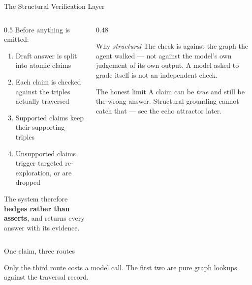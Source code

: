 \documentclass[aspectratio=169,12pt]{beamer}
\begin{document}
\begin{frame}{The Structural Verification Layer}
  \begin{columns}[T]
    \begin{column}{0.5\textwidth}
      \small
      Before anything is emitted:
      \begin{enumerate}
        \item Draft answer is split into \alert{atomic claims}
        \item Each claim is checked against the \alert{triples actually
          traversed}
        \item Supported claims keep their supporting triples
        \item Unsupported claims trigger \alert{targeted re-exploration}, or
          are \alert{dropped}
      \end{enumerate}
      \vspace{2mm}
      The system therefore \textbf{hedges rather than asserts}, and returns
      every answer with its evidence.
    \end{column}
    \begin{column}{0.48\textwidth}
      \begin{block}{Why \emph{structural}}
        \small
        The check is against the graph the agent walked --- not against the
        model's own judgement of its own output. A model asked to grade itself
        is not an independent check.
      \end{block}
      \vspace{2mm}
      \begin{block}{The honest limit}
        \small
        A claim can be \emph{true} and still be the wrong answer. Structural
        grounding cannot catch that --- see the echo attractor later.
      \end{block}
    \end{column}
  \end{columns}
\end{frame}

\begin{frame}{One claim, three routes}
  \centering
  \resizebox{!}{0.68\textheight}{}

  \vspace{1mm}
  {\small Only the third route costs a model call. The first two are pure graph
  lookups against the traversal record.}
\end{frame}
\end{document}
